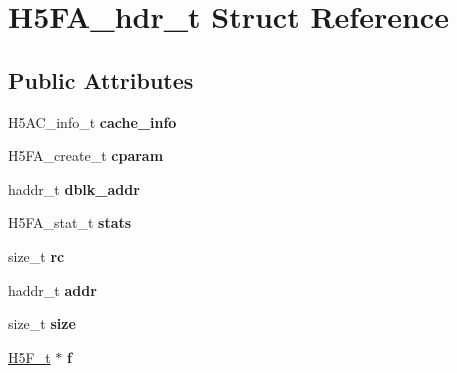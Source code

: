 \hypertarget{struct_h5_f_a__hdr__t}{}\section{H5\+F\+A\+\_\+hdr\+\_\+t Struct Reference}
\label{struct_h5_f_a__hdr__t}
\subsection*{Public Attributes}
\begin{DoxyCompactItemize}
\item 
\mbox{\label{struct_h5_f_a__hdr__t_a330f2f175552242cc7e5b78c563441e9}} 
H5\+A\+C\+\_\+info\+\_\+t {\bfseries cache\+\_\+info}
\item 
\mbox{\label{struct_h5_f_a__hdr__t_a2f13c95e3389087683a5dd89570ec9c5}} 
H5\+F\+A\+\_\+create\+\_\+t {\bfseries cparam}
\item 
\mbox{\label{struct_h5_f_a__hdr__t_a0fed289462b8aa46210497b1422ccf80}} 
haddr\+\_\+t {\bfseries dblk\+\_\+addr}
\item 
\mbox{\label{struct_h5_f_a__hdr__t_a2d11219b9fde8568d6053e1932dc9cf4}} 
H5\+F\+A\+\_\+stat\+\_\+t {\bfseries stats}
\item 
\mbox{\label{struct_h5_f_a__hdr__t_abd4d4ec8665f2491a44cd3d5e83760bb}} 
size\+\_\+t {\bfseries rc}
\item 
\mbox{\label{struct_h5_f_a__hdr__t_a4916e779e581a1768ecf2d3f929e792c}} 
haddr\+\_\+t {\bfseries addr}
\item 
\mbox{\label{struct_h5_f_a__hdr__t_a917dab676787c22f881a1948915e1b56}} 
size\+\_\+t {\bfseries size}
\item 
\mbox{\label{struct_h5_f_a__hdr__t_a0bd475c9aa2668b6759c4adf7299c63f}} 
\hyperlink{struct_h5_f__t}{H5\+F\+\_\+t} $\ast$ {\bfseries f}
\item 
\mbox{\label{struct_h5_f_a__hdr__t_a2b0db7e72d4a7ef647df9afa37124c5e}} 

\end{DoxyCompactItemize}
